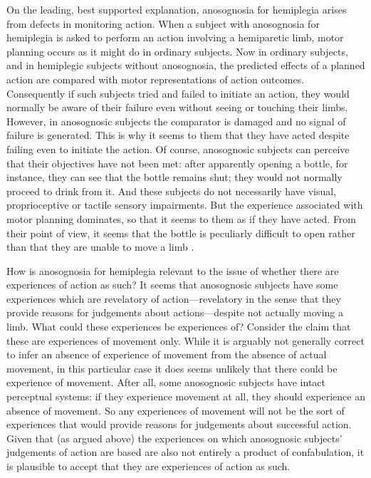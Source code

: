 \documentclass[12pt,\papersize]{extarticle}
\begin{document}
On the leading, best supported explanation, anosognosia for hemiplegia arises from defects in monitoring action.  When a subject with anosognosia for hemiplegia is asked to perform an action involving a hemiparetic limb, motor planning occurs as it might do in ordinary subjects. Now in ordinary subjects, and in hemiplegic subjects without anosognosia, the predicted effects of a planned action are compared with motor representations of action outcomes.  Consequently if such subjects tried and failed to initiate an action, they would normally be aware of their failure even without seeing or touching their limbs. However, in anosognosic subjects the comparator is damaged and no signal of failure is generated.  This is why it seems to them that they have acted despite failing even to initiate the action.  Of course, anosognosic subjects can perceive that their objectives have not been met: after apparently opening a bottle, for instance, they can see that the bottle remains shut; they would not normally proceed to drink from it.  And these subjects do not necessarily have visual, proprioceptive or tactile sensory impairments.  But the experience associated with motor planning dominates, so that it seems to them as if they have acted.  From their point of view, it seems that the bottle is peculiarly difficult to open rather than that they are unable to move a limb \citep[pp.\ 173-4]{berti:2008_motor}.  

How is anosognosia for hemiplegia relevant to the issue of whether there are experiences of action as such?  It seems that anosognosic subjects have some experiences which are revelatory of action---revelatory in the sense that they provide reasons for judgements about actions---despite not actually moving a limb.  What could these experiences be experiences of?  Consider the claim that these are experiences of movement only.  While it is arguably not generally correct to infer an absence of experience of movement from the absence of actual movement, in this particular case it does seems unlikely that there could be experience of movement.  After all, some anosognosic subjects have intact perceptual systems: if they experience movement at all, they should experience an absence of movement.  So any experiences of movement will not be the sort of experiences that would provide reasons for judgements about successful action.  Given that (as argued above) the experiences on which anosognosic subjects' judgements of action are based are also not entirely a product of confabulation, it is plausible to accept that they are experiences of action as such.
\end{document}

